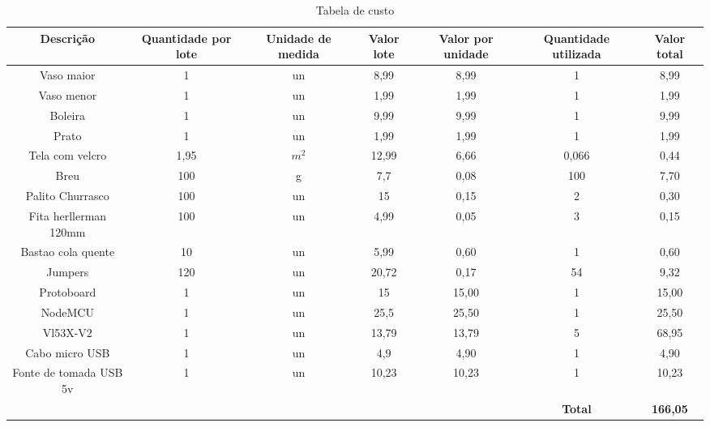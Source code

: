 \documentclass[
	12pt,				%
	openright,			%
	oneside,			%
	a4paper,			%
	chapter=TITLE,		%
	english,			%
	brazil				%
	]{abntex2}
\begin{document}
\begin{center}     
        \begin{table}[H]
            \caption{Tabela de custo}
            \label{tab:custos} 
            \begin{adjustbox}{width=\textwidth}  
        \begin{tabular}{ |c|c|c|c|c|c|c| }                           
            \hline
            \rowcolor{lightgray} \textbf{Descrição} & \textbf{Quantidade por lote} & \textbf{Unidade de medida} & \textbf{Valor lote} & \textbf{Valor por unidade} & \textbf{Quantidade utilizada} & \textbf{Valor total} \\
            \hline
            Vaso maior & 1 & un & 8,99 & 8,99 & 1 & 8,99 \\
            \hline
            Vaso menor & 1 & un & 1,99 & 1,99 & 1 & 1,99 \\
            \hline
            Boleira & 1 & un & 9,99 & 9,99 & 1 & 9,99 \\
            \hline
            Prato & 1 & un & 1,99 & 1,99 & 1 & 1,99 \\
            \hline
            Tela com velcro & 1,95 & $m^{2}$ & 12,99 & 6,66 & 0,066 & 0,44 \\
            \hline
            Breu & 100 & g & 7,7 & 0,08 & 100 & 7,70 \\
            \hline
            Palito Churrasco & 100 & un & 15 & 0,15 & 2 & 0,30 \\
            \hline
            Fita herllerman 120mm & 100 & un & 4,99 & 0,05 & 3 & 0,15 \\
            \hline
            Bastao cola quente & 10 & un & 5,99 & 0,60 & 1 & 0,60 \\
            \hline
            Jumpers & 120 & un & 20,72 & 0,17 & 54 & 9,32 \\
            \hline
            Protoboard & 1 & un & 15 & 15,00 & 1 & 15,00 \\
            \hline
            NodeMCU & 1 & un & 25,5 & 25,50 & 1 & 25,50 \\
            \hline
            Vl53X-V2 & 1 & un & 13,79 & 13,79 & 5 & 68,95 \\
            \hline
            Cabo micro USB & 1 & un & 4,9 & 4,90 & 1 & 4,90 \\
            \hline
            Fonte de tomada USB 5v & 1 & un & 10,23 & 10,23 & 1 & 10,23 \\
            \hline           
            &  &  &  &  & \textbf{Total} & \textbf{166,05} \\
            \hline
        \end{tabular}  
    \end{adjustbox}
    \end{table}    
\end{center}
\end{document}

